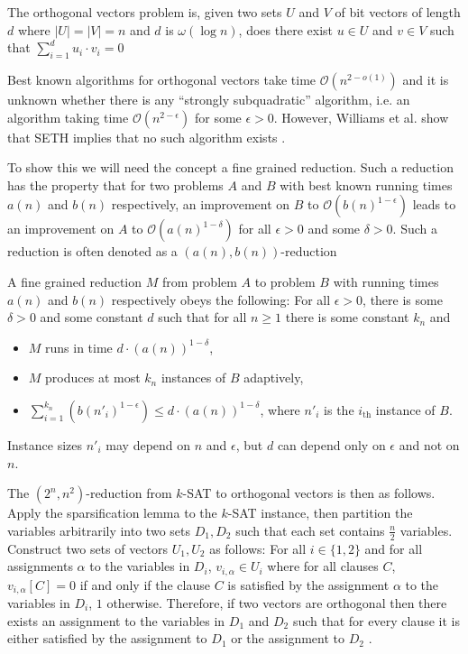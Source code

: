 \begin{definition}
    The orthogonal vectors problem is, given two sets $U$ and $V$ of bit vectors of length
    $d$ where $|U| = |V| = n$ and $d$ is $\omega(\log n)$, does there exist $u \in U$ and
    $v \in V$ such that $\sum_{i = 1}^{d} u_i \cdot v_i = 0$
\end{definition}

Best known algorithms for orthogonal vectors take time $\mathcal{O}(n^{2 - o(1)})$ and
it is unknown whether there is any ``strongly subquadratic'' algorithm, i.e. an
algorithm taking time $\mathcal{O}(n^{2 - \epsilon})$ for some $\epsilon > 0$. However,
Williams et al. show that SETH implies that no such algorithm exists \cite{williams2004new}.

To show this we will need the concept a fine grained reduction. Such a reduction
has the property that for two problems $A$ and $B$ with best known running times
$a(n)$ and $b(n)$ respectively, an improvement on $B$ to $\mathcal{O}(b(n)^{1 - \epsilon})$
leads to an improvement on $A$ to $\mathcal{O}(a(n)^{1 - \delta})$ for all $\epsilon > 0$
and some $\delta > 0$. Such a reduction is often denoted as a $(a(n), b(n))$-reduction \cite{vassilevska2015hardness}

\begin{definition}
    A fine grained reduction $M$ from problem $A$ to problem $B$ with running times
    $a(n)$ and $b(n)$ respectively obeys the following:
    For all $\epsilon > 0$, there is some $\delta > 0$ and some constant $d$
    such that for all $n \geq 1$ there is some constant $k_n$ and
    \begin{itemize}
        \item $M$ runs in time $d \cdot (a(n))^{1 - \delta}$,
        \item $M$ produces at most $k_n$ instances of $B$ adaptively,
        \item $\sum_{i = 1}^{k_n}(b(n'_i)^{1 - \epsilon}) \leq d \cdot (a(n))^{1 - \delta}$, where $n'_i$ is the
        $i_{\text{th}}$ instance of $B$. 
    \end{itemize}
    Instance sizes $n'_i$ may depend on $n$ and $\epsilon$, but $d$ can depend only on $\epsilon$ and not on $n$.
\end{definition}

The $(2^n, n^2)$-reduction from $k$-SAT to orthogonal vectors is then as follows. Apply the sparsification lemma
to the $k$-SAT instance, then partition the variables arbitrarily into two sets $D_1, D_2$ such
that each set contains $\frac{n}{2}$ variables. Construct two sets of vectors $U_1, U_2$ as follows:
For all $i \in \{1,2\}$ and for all assignments $\alpha$ to the variables in $D_i$, $v_{i, \alpha} \in U_i$
where for all clauses $C$, $v_{i, \alpha}[C] = 0$ if and only if the clause $C$ is satisfied by the
assignment $\alpha$ to the variables in $D_i$, $1$ otherwise. Therefore, if two vectors are orthogonal then
there exists an assignment to the variables in $D_1$ and $D_2$ such that for every clause it
is either satisfied by the assignment to $D_1$ or the assignment to $D_2$ \cite{williams2004new}.

